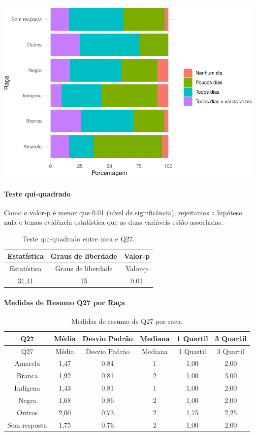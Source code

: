 \documentclass[]{article}
\let\oldparagraph\paragraph
\renewcommand{\paragraph}[1]{\oldparagraph{#1}\mbox{}}
\begin{document}
\begin{center}\includegraphics[width=0.75\linewidth]{relatorio_covid19_files/figure-latex/unnamed-chunk-810-1} \end{center}

\hypertarget{teste-qui-quadrado-70}{%
\paragraph{Teste qui-quadrado}\label{teste-qui-quadrado-70}}

Como o valor-p é menor que 0.01 (nível de significância), rejeitamos a hipótese nula e temos evidência estatística que as duas variáveis estão associadas.

\begin{longtable}[]{@{}ccc@{}}
\caption{\label{tab:unnamed-chunk-812}Teste qui-quadrado entre raca e Q27.}\tabularnewline
\toprule
Estatística & Graus de liberdade & Valor-p\tabularnewline
\midrule
\endfirsthead
\toprule
Estatística & Graus de liberdade & Valor-p\tabularnewline
\midrule
\endhead
31,41 & 15 & 0,01\tabularnewline
\bottomrule
\end{longtable}

\cleardoublepage

\hypertarget{medidas-de-resumo-q27-por-rauxe7a}{%
\paragraph{Medidas de Resumo Q27 por Raça}\label{medidas-de-resumo-q27-por-rauxe7a}}

\begin{longtable}[]{@{}cccccc@{}}
\caption{\label{tab:unnamed-chunk-813}Medidas de resumo de Q27 por raca.}\tabularnewline
\toprule
Q27 & Média & Desvio Padrão & Mediana & 1 Quartil & 3 Quartil\tabularnewline
\midrule
\endfirsthead
\toprule
Q27 & Média & Desvio Padrão & Mediana & 1 Quartil & 3 Quartil\tabularnewline
\midrule
\endhead
Amarela & 1,47 & 0,84 & 1 & 1,00 & 2,00\tabularnewline
Branca & 1,92 & 0,81 & 2 & 1,00 & 3,00\tabularnewline
Indígena & 1,43 & 0,81 & 1 & 1,00 & 2,00\tabularnewline
Negra & 1,68 & 0,86 & 2 & 1,00 & 2,00\tabularnewline
Outros & 2,00 & 0,73 & 2 & 1,75 & 2,25\tabularnewline
Sem resposta & 1,75 & 0,76 & 2 & 1,00 & 2,00\tabularnewline
\bottomrule
\end{longtable}
\end{document}
